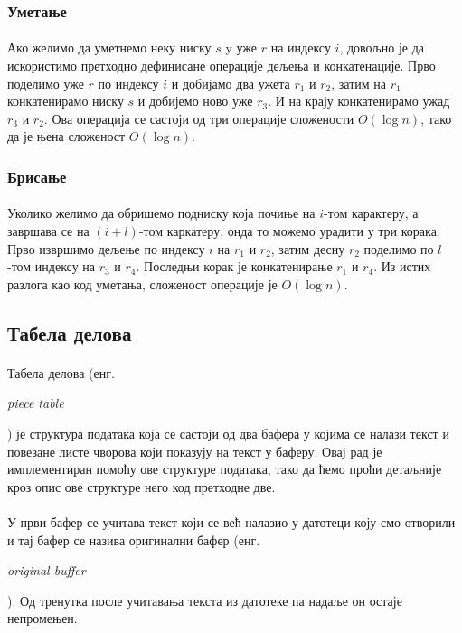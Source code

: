 \documentclass[12pt,oneside]{memoir}
\begin{document}
\subsubsection{Уметање}
\paragraph{}
Ако желимо да уметнемо неку ниску \(s\) y уже \(r\) на индексу \(i\), довољно је да искористимо претходно дефинисане операције дељења и конкатенације. Прво поделимо уже \(r\) по индексу \(i\)
и добијамо два ужета \(r_1\) и \(r_2\), затим на \(r_1\) конкатенирамо ниску \(s\) и добијемо
ново уже \(r_3\). И на крају конкатенирамо ужад \(r_3\) и \(r_2\). Ова операција се састоји
од три операције сложености \(O(\log{}n)\), тако да је њена сложеност \(O(\log{}n)\).

\subsubsection{Брисање}
\paragraph{}
Уколико желимо да обришемо подниску која почиње на \(i\)-том карактеру, а завршава се на
\((i+l)\)-том каркатеру, онда то можемо урадити у три корака. Прво извршимо дељење по индексу 
\(i\) на \(r_1\) и \(r_2\), затим десну \(r_2\) поделимо по \(l\)-том индексу на \(r_3\)
и \(r_4\). Последњи корак је конкатенирање \(r_1\) и \(r_4\). Из истих разлога као код
уметања, сложеност операције је \(O(\log{}n)\).

\subsection{Табела делова}
\paragraph{}
Табела делова (енг. \begin{latinica}\textit{piece table}\end{latinica}) је структура података
која се састоји од два бафера у којима се налази текст и повезане листе чворова који показују
на текст у баферу. Овај рад је имплементиран помоћу ове структуре података, тако да ћемо проћи
детаљније кроз опис ове структуре него код претходне две.

\paragraph{}
У први бафер се учитава текст који се већ налазио у датотеци коју смо
отворили и тај бафер се назива оригинални бафер (енг. \begin{latinica}\textit{original buffer}\end{latinica}). Од тренутка после учитавања текста из датотеке па надаље он остаје непромењен. 
\end{document}
